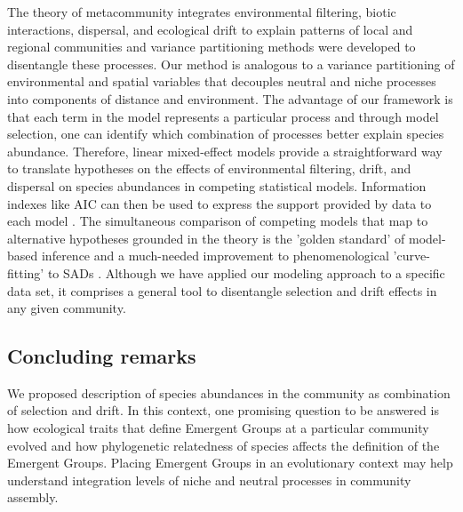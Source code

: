 \documentclass[12pt]{article}
\begin{document}
The theory of metacommunity integrates environmental filtering, biotic interactions, dispersal, and ecological drift to explain patterns of local and regional communities \citep{leibold2017metacommunity, o2019metacommunity} and variance partitioning methods were developed to disentangle these processes. 
 Our method is analogous to a variance partitioning of environmental and spatial variables \citep{Gilbert2004a} that decouples neutral and niche processes into components of distance and environment. The advantage of our framework is that each term in the model represents a particular process and through model selection, one can identify which combination of processes better explain species abundance. Therefore, linear mixed-effect models provide a straightforward way to translate hypotheses on the effects of environmental filtering, drift, and dispersal on species abundances in competing statistical models. Information indexes like AIC can then be used to express the support provided by data to each model \citep{Burham2002, Johnson2004}. The simultaneous comparison of competing models that map to alternative hypotheses grounded in the theory is the 'golden standard' of model-based inference \citep{Hilborn1997} and a much-needed improvement to phenomenological 'curve-fitting' to SADs \citep{Mcgill2003}. Although we have applied our modeling approach to a specific data set, it comprises a general tool to disentangle selection and drift effects in any given community. 


 \subsection*{Concluding remarks}
We proposed %
description of species abundances in the community as combination of selection and drift.
In this context, one promising question to be answered is how ecological traits that define Emergent Groups at a particular community
evolved and how phylogenetic relatedness of species affects the definition of the Emergent Groups. Placing Emergent Groups in an evolutionary context may help understand integration levels of niche
and neutral processes in community assembly. %
\end{document}
